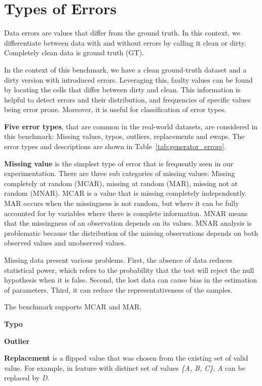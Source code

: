 \section{Types of Errors}
\label{sec:error_types}

Data errors are values that differ from the ground truth.
In this context, we differentiate between data with and without errors by calling it clean or dirty. 
Completely clean data is ground truth (GT).  


In the context of this benchmark, we have a clean ground-truth dataset and a dirty version with introduced errors.  
Leveraging this, faulty values can be found by locating the cells that differ between dirty and clean. 
This information is helpful to detect errors and their distribution, and frequencies of specific values being error prone.  
Moreover, it is useful for classification of error types.


\textbf{Five error types}, that are common in the real-world datasets, are considered in this benchmark: 
Missing values, typos, outliers, replacements and swaps. 
The error types and descriptions are shown in Table~\ref{tab:generator_errors}.


\textbf{Missing value} is the simplest type of error that is frequently seen in our experimentation. 
There are three sub categories of missing values: 
Missing completely at random (MCAR), missing at random (MAR), missing not at random (MNAR). 
MCAR is a value that is missing completely independently. 
MAR occurs when the missingness is not random, but where it can be fully accounted for by variables where there is complete information. 
MNAR means that the missingness of an observation depends on its values. MNAR analysis is problematic because the distribution of the missing observations depends on both observed values and unobserved values.

Missing data present various problems. First, the absence of data reduces statistical power, which refers to the probability that the test will reject the null hypothesis when it is false. Second, the lost data can cause bias in the estimation of parameters. Third, it can reduce the representativeness of the samples.

The benchmark supports MCAR and MAR.


\textbf{Typo}


\textbf{Outlier}

\textbf{Replacement} is a flipped value that was chosen from the existing set of valid value. For example, in feature with distinct set of values \emph{\{A, B, C\}}, \emph{A} can be replaced by \emph{D}. 


